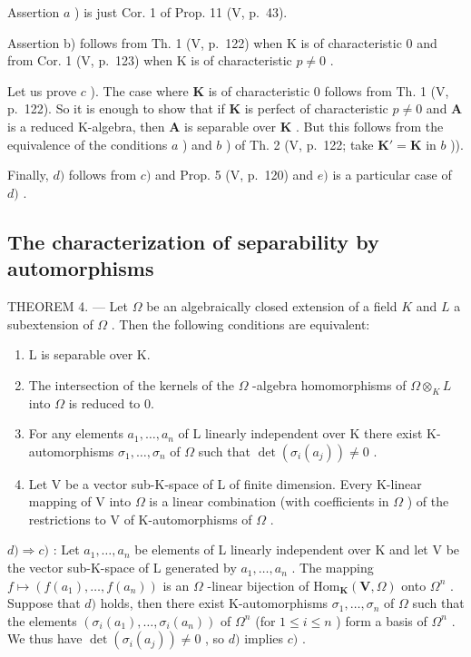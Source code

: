 Assertion \(a\) ) is just Cor. 1 of Prop. 11 (V, p.~43).

Assertion b) follows from Th. 1 (V, p.~122) when K is of characteristic 0 and from Cor. 1 (V, p.~123) when K is of characteristic \(p \neq 0\) .

Let us prove \(c\) ). The case where \(\mathbf{K}\) is of characteristic 0 follows from Th. 1 (V, p.~122). So it is enough to show that if \(\mathbf{K}\) is perfect of characteristic \(p \neq 0\) and \(\mathbf{A}\) is a reduced K-algebra, then \(\mathbf{A}\) is separable over \(\mathbf{K}\) . But this follows from the equivalence of the conditions \(a\) ) and \(b\) ) of Th. 2 (V, p.~122; take \(\mathbf{K}' = \mathbf{K}\) in \(b\) )).

Finally, \(d)\) follows from \(c)\) and Prop. 5 (V, p.~120) and \(e)\) is a particular case of \(d)\) .

\subsection{The characterization of separability by automorphisms}

THEOREM 4. --- Let \(\Omega\) be an algebraically closed extension of a field \(K\) and \(L\) a subextension of \(\Omega\) . Then the following conditions are equivalent:

\begin{enumerate}
\def\labelenumi{\alph{enumi})}
\item
  L is separable over K.
\item
  The intersection of the kernels of the \(\Omega\) -algebra homomorphisms of \(\Omega \otimes_{K} L\) into \(\Omega\) is reduced to 0.
\item
  For any elements \(a_1, \ldots, a_n\) of L linearly independent over K there exist K-automorphisms \(\sigma_1, \ldots, \sigma_n\) of \(\Omega\) such that \(\det(\sigma_i(a_j)) \neq 0\) .
\item
  Let V be a vector sub-K-space of L of finite dimension. Every K-linear mapping of V into \(\Omega\) is a linear combination (with coefficients in \(\Omega\) ) of the restrictions to V of K-automorphisms of \(\Omega\) .
\end{enumerate}

\(d) \Rightarrow c)\) : Let \(a_1, \ldots, a_n\) be elements of L linearly independent over K and let V be the vector sub-K-space of L generated by \(a_1, \ldots, a_n\) . The mapping \(f \mapsto (f(a_1), \ldots, f(a_n))\) is an \(\Omega\) -linear bijection of \(\mathrm{Hom}_{\mathbf{K}}(\mathbf{V}, \Omega)\) onto \(\Omega^n\) . Suppose that \(d)\) holds, then there exist K-automorphisms \(\sigma_1, \ldots, \sigma_n\) of \(\Omega\) such that the elements \((\sigma_i(a_1), \ldots, \sigma_i(a_n))\) of \(\Omega^n\) (for \(1 \leqslant i \leqslant n\) ) form a basis of \(\Omega^n\) . We thus have \(\det(\sigma_i(a_j)) \neq 0\) , so \(d)\) implies \(c)\) .

